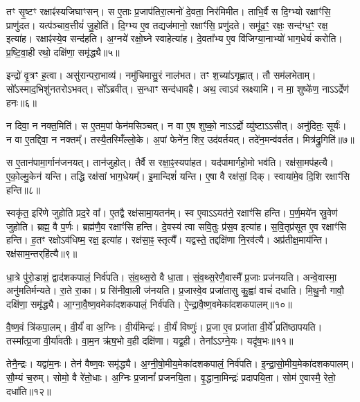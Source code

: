 तꣳ सृ॒ष्टꣳ रक्षाꣴ॑स्यजिघाꣳसन्।
स ए॒ताः प्र॒जा\-प॑तिरा॒त्मनो॑ दे॒वता॒ निर॑मिमीत।
ताभि॒र्वै स दि॒ग्भ्यो रक्षाꣳ॑सि॒ प्राणु॑दत।
यत्प॑ञ्चाव॒त्तीयं॑ जु॒होति॑।
दि॒ग्भ्य ए॒व तद्यज॑मानो॒ रक्षाꣳ॑सि॒ प्रणु॑दते।
समू॑ढ॒ꣳ॒ रक्षः॒ सन्द॑ग्ध॒ꣳ॒ रक्ष॒ इत्या॑ह।
रक्षाꣴ॑स्ये॒व सन्द॑हति।
अ॒ग्नये॑ रक्षो॒घ्ने स्वाहेत्या॑ह।
दे॒वता᳚भ्य ए॒व वि॑जिग्या॒नाभ्यो॑ भाग॒धेयं॑ करोति।
प्र॒ष्टि॒वा॒ही रथो॒ दक्षि॑णा॒ समृ॑द्ध्यै॥५॥\ip

इन्द्रो॑ वृ॒त्रꣳ ह॒त्वा।
असु॑रान्परा॒भाव्य॑।
नमु॑चिमासु॒रं नाल॑भत।
तꣳ श॒च्या॑\-ऽगृह्णात्।
तौ सम॑लभेताम्।
सो᳚ऽस्माद॒भिशु॑नतरो\-ऽभवत्।
सो᳚ऽब्रवीत्।
स॒न्धाꣳ सन्द॑धावहै।
अथ॒ त्वाऽव॑ स्रक्ष्यामि।
न मा॒ शुष्के॑ण॒ नाऽऽर्द्रेण॑ हनः॥६॥\ip

न दिवा॒ न नक्त॒मिति॑।
स ए॒तम॒पां फेन॑मसिञ्चत्।
न वा ए॒ष शुष्को॒ नाऽऽर्द्रो व्यु॑ष्टा\-ऽऽसीत्।
अनु॑दितः॒ सूर्यः॑।
न वा ए॒तद्दिवा॒ न नक्तम्᳚।
तस्यै॒तस्मिँ॑ल्लो॒के।
अ॒पां फेने॑न॒ शिर॒ उद॑वर्तयत्।
तदे॑न॒मन्व॑वर्तत।
मित्र॑द्रु॒गिति॑॥७॥\ip

स ए॒तान॑पामा॒र्गान॑जनयत्।
तान॑जुहोत्।
तैर्वै स रक्षा॒ꣴ॒स्यपा॑हत।
यद॑पामार्गहो॒मो भव॑ति।
रक्ष॑सा॒मप॑हत्यै।
ए॒को॒ल्मु॒केन॑ यन्ति।
तद्धि रक्ष॑सां भाग॒धेयम्᳚।
इ॒मान्दिशं॑ यन्ति।
ए॒षा वै रक्ष॑सां॒ दिक्।
स्वाया॑मे॒व दि॒शि रक्षाꣳ॑सि हन्ति॥८॥\ip

स्वकृ॑त॒ इरि॑णे जुहोति प्रद॒रे वा᳚।
ए॒तद्वै रक्ष॑सामा॒यतन॑म्।
स्व ए॒वाऽऽयत॑ने॒ रक्षाꣳ॑सि हन्ति।
प॒र्ण॒मये॑न स्रु॒वेण॑ जुहोति।
ब्रह्म॒ वै प॒र्णः।
ब्रह्म॑णै॒व रक्षाꣳ॑सि हन्ति।
दे॒वस्य॑ त्वा सवि॒तुः प्र॑स॒व इत्या॑ह।
स॒वि॒तृप्र॑सूत ए॒व रक्षाꣳ॑सि हन्ति।
ह॒तꣳ रक्षो\-ऽव॑धिष्म॒ रक्ष॒ इत्या॑ह।
रक्ष॑सा॒ꣴ॒ स्तृत्यै᳚।
यद्वस्ते॒ तद्दक्षि॑णा नि॒रव॑त्यै।
अप्र॑तीक्ष॒माय॑न्ति।
रक्ष॑साम॒न्तर्‌\mbox{}हि॑त्यै॥९॥\ip\anuvakamend[य॒च्छ॒ति॒ वरु॑णं॒ तृती॑यं॒ विजि॑त्या अ\-सृजत॒ समृ॑द्ध्यै हनो॒ मित्र॑द्रु॒गिति॑ हन्ति॒ स्तृत्यै॒ त्रीणि॑ च]

धा॒त्रे पु॑रो॒डाशं॒ द्वाद॑शकपालं॒ निर्व॑पति।
सं॒व॒थ्स॒रो वै धा॒ता।
सं॒व॒थ्स॒रेणै॒वास्मै᳚ प्र॒जाः प्रज॑नयति।
अन्वे॒वास्मा॒ अनु॑मतिर्मन्यते।
रा॒ते रा॒का।
प्र सि॑नीवा॒ली ज॑नयति।
प्र॒जास्वे॒व प्रजा॑तासु कु॒ह्वा॑ वाचं॑ दधाति।
मि॒थु॒नौ गावौ॒ दक्षि॑णा॒ समृ॑द्ध्यै।
आ॒ग्ना॒वै॒ष्ण॒वमेका॑\-दश\-कपालं॒ निर्व॑पति।
ऐ॒न्द्रा॒वै॒ष्ण॒वमेका॑\-दश\-कपालम्॥१०॥\ip

वै॒ष्ण॒वं त्रि॑कपा॒लम्।
वी॒र्यं॑ वा अ॒ग्निः।
वी॒र्य॑मिन्द्रः॑।
वी॒र्यं॑ विष्णुः॑।
प्र॒जा ए॒व प्रजा॑ता वी॒र्ये᳚ प्रति॑\-ष्ठापयति।
तस्मा᳚त्प्र॒जा वी॒र्या॑वतीः।
वा॒म॒न ऋ॑ष॒भो व॒ही दक्षि॑णा।
यद्व॒ही।
तेना᳚ऽऽग्ने॒यः।
यदृ॑ष॒भः॥११॥\ip

तेनै॒न्द्रः।
यद्वा॑म॒नः।
तेन॑ वैष्ण॒वः समृ॑द्ध्यै।
अ॒ग्नी॒षो॒मीय॒मेका॑\-दश\-कपालं॒ निर्व॑पति।
इ॒न्द्रा॒सो॒मीय॒मेका॑\-दश\-कपालम्।
सौ॒म्यं च॒रुम्।
सोमो॒ वै रे॑तो॒धाः।
अ॒ग्निः प्र॒जानां᳚ प्रजनयि॒ता।
वृ॒द्धाना॒मिन्द्रः॑ प्रदापयि॒ता।
सोम॑ ए॒वास्मै॒ रेतो॒ दधा॑ति॥१२॥\ip

